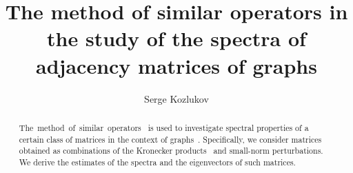 \documentclass[a4paper]{jpconf}
\begin{document}
\title{The method of similar operators in the study of the spectra of adjacency matrices of graphs}

\author{Serge Kozlukov}

\address{\emph{Voronezh State University}, 1 Universitetskaya Ploshad', Voronezh, RU 394036}


\begin{abstract}
    The~method~of~similar~operators~\cite{baskakov1983methods,baskakov2014memory,baskakov2017method,baskakov2013completeness}
        is used to investigate spectral properties
        of a certain class of matrices in the context of graphs~\cite{van2003graphs,cvetkovic1980spectra}.
    Specifically, we consider matrices
        obtained as combinations
        of the Kronecker products~\cite{bellman-matrices-kron,XIANG2005210}
        and small-norm perturbations.
    We derive the estimates
        of the spectra and the eigenvectors
        of such matrices.
\end{abstract}
\end{document}
